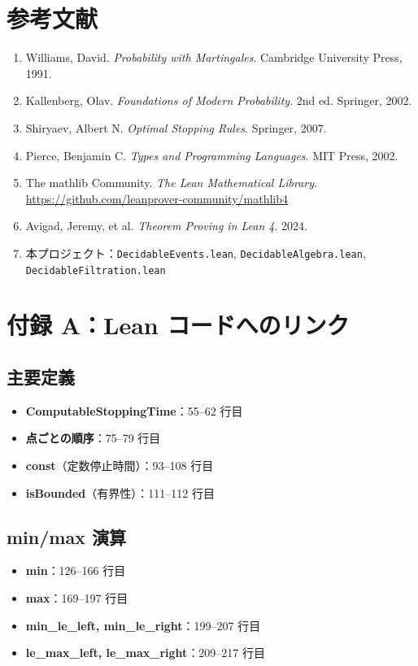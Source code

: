 \documentclass[12pt,a4paper,ja=standard]{bxjsarticle}
\theoremstyle{definition}
\begin{document}
\section*{参考文献}

\begin{enumerate}
    \item Williams, David. \textit{Probability with Martingales}. Cambridge University Press, 1991.
    \item Kallenberg, Olav. \textit{Foundations of Modern Probability}. 2nd ed. Springer, 2002.
    \item Shiryaev, Albert N. \textit{Optimal Stopping Rules}. Springer, 2007.
    \item Pierce, Benjamin C. \textit{Types and Programming Languages}. MIT Press, 2002.
    \item The mathlib Community. \textit{The Lean Mathematical Library}. \url{https://github.com/leanprover-community/mathlib4}
    \item Avigad, Jeremy, et al. \textit{Theorem Proving in Lean 4}. 2024.
    \item 本プロジェクト：\texttt{DecidableEvents.lean}, \texttt{DecidableAlgebra.lean}, \texttt{DecidableFiltration.lean}
\end{enumerate}

\section*{付録 A：Lean コードへのリンク}

\subsection*{主要定義}

\begin{itemize}
    \item \textbf{ComputableStoppingTime}：55--62 行目
    \item \textbf{点ごとの順序}：75--79 行目
    \item \textbf{const}（定数停止時間）：93--108 行目
    \item \textbf{isBounded}（有界性）：111--112 行目
\end{itemize}

\subsection*{min/max 演算}

\begin{itemize}
    \item \textbf{min}：126--166 行目
    \item \textbf{max}：169--197 行目
    \item \textbf{min\_le\_left, min\_le\_right}：199--207 行目
    \item \textbf{le\_max\_left, le\_max\_right}：209--217 行目
\end{itemize}
\end{document}
